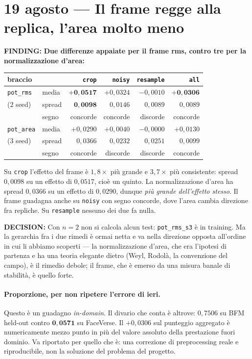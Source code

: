 \documentclass[11pt,a4paper]{article}
\newcommand{\finding}[1]{\textcolor{finding}{\textbf{FINDING:}} #1}
\newcommand{\decision}[1]{\textcolor{decision}{\textbf{DECISION:}} #1}
\begin{document}
\section{19 agosto --- Il frame regge alla replica, l'area molto meno}

\finding{\textbf{Due differenze appaiate per il frame rms, contro tre per la normalizzazione
d'area:}}

\begin{center}\small
\begin{tabular}{llrrrr}
\toprule
braccio & & \texttt{crop} & \texttt{noisy} & \texttt{resample} & \texttt{all} \\
\midrule
\texttt{pot\_rms}  & media  & $\mathbf{+0{,}0517}$ & $+0{,}0324$ & $-0{,}0010$ & $\mathbf{+0{,}0306}$ \\
($2$ seed)         & spread & $\mathbf{0{,}0098}$ & $0{,}0146$ & $0{,}0089$ & $0{,}0089$ \\
                   & segno  & concorde & concorde & discorde & concorde \\
\midrule
\texttt{pot\_area} & media  & $+0{,}0290$ & $+0{,}0040$ & $-0{,}0000$ & $+0{,}0130$ \\
($3$ seed)         & spread & $0{,}0366$ & $0{,}0232$ & $0{,}0251$ & $0{,}0099$ \\
                   & segno  & concorde & discorde & discorde & concorde \\
\bottomrule
\end{tabular}
\end{center}

Su \texttt{crop} l'effetto del frame \`e $1{,}8\times$ pi\`u grande e $3{,}7\times$ pi\`u
consistente: spread $0{,}0098$ su un effetto di $0{,}0517$, cio\`e un quinto. La normalizzazione
d'area ha spread $0{,}0366$ su un effetto di $0{,}0290$, dunque \emph{pi\`u grande dell'effetto
stesso}. Il frame guadagna anche su \texttt{noisy} con segno concorde, dove l'area cambia
direzione fra repliche. Su \texttt{resample} nessuno dei due fa nulla.

\decision{Con $n=2$ non si calcola alcun test: \texttt{pot\_rms\_s3} \`e in training. Ma la
gerarchia fra i due rimedi \`e ormai netta e va nella direzione opposta all'ordine in cui li
abbiamo scoperti --- la normalizzazione d'area, che era l'ipotesi di partenza e ha una teoria
elegante dietro (Weyl, Rodol\`a, la convenzione del campo), \`e il rimedio debole; il frame, che
\`e emerso da una misura banale di stabilit\`a, \`e quello forte.}

\paragraph{Proporzione, per non ripetere l'errore di ieri.} Questo \`e un guadagno
\emph{in-domain}. Il divario che conta \`e altrove: $0{,}7506$ su BFM held-out contro
$\mathbf{0{,}0571}$ su FaceVerse. Il $+0{,}0306$ sul punteggio aggregato \`e numericamente
mezzo punto in pi\`u del valore assoluto della prestazione fuori dominio. Va riportato per
quello che \`e: una correzione di preprocessing reale e riproducibile, non la soluzione del
problema del progetto.
\end{document}

